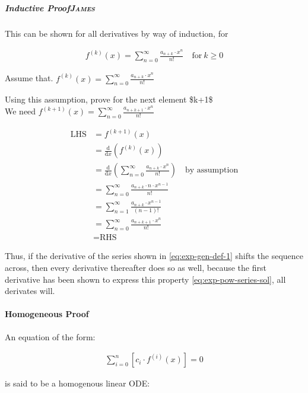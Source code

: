 \documentclass[11pt]{article}
\begin{document}
\subparagraph[Inductive Proof]{Inductive Proof\hfill{}\textsc{James}}
\label{sec:org55a3681}
This can be shown for all derivatives by way of induction, for

\begin{align}
f^{(k)}\left(x\right) = \sum_{n=0}^\infty\frac{a_{n+k}\cdot x^n}{n!} \quad \text{for}~k \ge 0
\end{align}

Assume that. \(f^{(k)}\left(x\right) = \sum_{n=0}^\infty\frac{a_{n+k}\cdot x^n}{n!}\)

Using this assumption, prove for the next element \$k+1\$\\

We need \(f^{(k+1)}(x) = \sum_{n=0}^\infty\frac{a_{n+k+1}\cdot x^n}{n!}\)

\begin{align*}
    \text{LHS} &= f^{(k+1)}(x)\\
    &= \frac{\mathrm{d}}{\mathrm{d}x}\left(f^{(k)}(x)\right)\\
    &= \frac{\mathrm{d}}{\mathrm{d}x}\left(\sum_{n=0}^\infty\frac{a_{n+k}\cdot x^n}{n!}\right)\quad \text{by assumption}\\
    &= \sum_{n=0}^\infty\frac{a_{n+k}\cdot n\cdot x^{n-1}}{n!}\\
    &= \sum_{n=1}^\infty\frac{a_{n+k}\cdot x^{n-1}}{(n-1)!}\\
    &= \sum_{n=0}^\infty\frac{a_{n+k+1}\cdot x^{n}}{n!}\\
    &= \text{RHS}
\end{align*}

Thus, if the derivative of the series shown in \eqref{eq:exp-gen-def-1} shifts the
sequence across, then every derivative thereafter does so as well, because the
first derivative has been shown to express this property
\eqref{eq:exp-pow-series-sol}, all derivates will.

\paragraph{Homogeneous Proof}
\label{sec:org2eeab30}
An equation of the form:

\begin{align}
\sum^{n}_{i=0} \left[ c_{i} \cdot f^{(i)}(x) \right] = 0 \label{eq:hom-ode}
\end{align}

is said to be a homogenous linear ODE: \cite[Ch. 2]{zillDifferentialEquations2009a}
\end{document}

